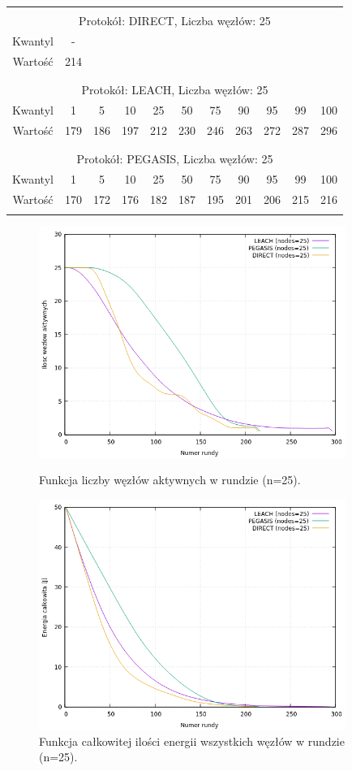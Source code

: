 \documentclass[a4paper,12pt,twoside,openany]{report}
\begin{document}
\begin{longtable}{*{11}{c}}
\toprule \\*
\multicolumn{11}{c}{Protokół: DIRECT, Liczba węzłów: 25} \\*
Kwantyl	& -	\\*
Wartość	& 214	\\*
\midrule \\*
\\*
\multicolumn{11}{c}{Protokół: LEACH, Liczba węzłów: 25} \\*
Kwantyl	& 1	& 5	& 10	& 25	& 50	& 75	& 90	& 95	& 99	& 100	\\*
Wartość	& 179	& 186	& 197	& 212	& 230	& 246	& 263	& 272	& 287	& 296	\\*
\midrule \\*
\\*
\multicolumn{11}{c}{Protokół: PEGASIS, Liczba węzłów: 25} \\*
Kwantyl	& 1	& 5	& 10	& 25	& 50	& 75	& 90	& 95	& 99	& 100	\\*
Wartość	& 170	& 172	& 176	& 182	& 187	& 195	& 201	& 206	& 215	& 216	\\*
\bottomrule \\*
\end{longtable}

\begin{figure}[H]
 \centering
 \includegraphics[width=10cm]{images/gnuplot/test_2/nodes_in_round_25.png}
 \caption{Funkcja liczby węzłów aktywnych w rundzie (n=25).}
 \includegraphics[width=10cm]{images/gnuplot/test_2/energy_in_round_25.png}
 \caption{Funkcja całkowitej ilości energii wszystkich węzłów w rundzie (n=25).}
\end{figure}
\end{document}

